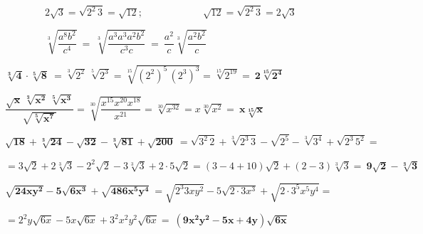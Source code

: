 \begin{miejemplo}

$\qquad \qquad 2\sqrt{3} =\sqrt{2^2\, 3} = \sqrt{12}; \qquad \qquad \qquad \sqrt{12}=\sqrt{2^2\, 3}=2\sqrt{3}$	

\vspace{2mm}$\qquad \qquad \sqrt[3] {\dfrac{a^8b^2}{c^4}} \ = \ \sqrt[3]{\dfrac{a^3 a^3 a^2 b^2 }{c^3 c}} \ = \ \dfrac{a^2}{c}\sqrt[3]{\dfrac{a^2b^2}{c}}$

\end{miejemplo}

\vspace{5mm}

\begin{miejercicio}

$\boldsymbol{\sqrt[3]{4}\cdot \sqrt[5]{8} } \ = \sqrt[3]{2^2} \, \sqrt[5]{2^3}=\sqrt[15]{(2^2)^5\, (2^3)^3}=\sqrt[15]{2^{19}}= \ \boldsymbol{ 2\sqrt[15]{2^4} }$

\end{miejercicio}

\begin{miejercicio}

$\boldsymbol{\dfrac{\sqrt{x}\, \sqrt[3]{x^2}\, \sqrt[5]{x^3}}{\sqrt{\sqrt[5]{x^7}}}} = \sqrt[30]{\dfrac{x^{15}x^{20}x^{18}}{x^{21}}}= \sqrt[30]{x^{32}}=x\sqrt[30]{x^2}=\ \boldsymbol{ x\sqrt[15]{x} }$
	
\end{miejercicio}

\begin{miejercicio}

$\boldsymbol{ \sqrt{18}+\sqrt[3]{24}-\sqrt{32}-\sqrt[3]{81}+\sqrt{200} } \ = \sqrt{3^2\, 2} +\sqrt[3]{2^3 \, 3} -\sqrt{2^5} -\sqrt[3]{3^4}+\sqrt{2^3\, 5^2}=$

$=3\sqrt{2}+2\sqrt[3]{3}-2^2\sqrt{2}-3\sqrt[3]{3}+2\cdot 5\sqrt{2}= (3-4+10)\sqrt{2}+(2-3)\sqrt[3]{3}=\ \boldsymbol{9\sqrt{2}-\sqrt[3]{3}}$
	
\end{miejercicio}


\begin{miejercicio}
	
$\boldsymbol{\sqrt{24xy^2}-5\sqrt{6x^3}+\sqrt{486x^5y^4}}\ =\sqrt{2^3 3 xy^2}-5\sqrt{2\cdot 3 x^3}+\sqrt{2\cdot 3^5x^5y^4}=  $

$=2^2 y \sqrt{6x}-5x\sqrt{6x}+3^2x^2y^2\sqrt{6x}=\ \boldsymbol{(9x^2y^2-5x+4y)\sqrt{6x}}$

\end{miejercicio}

